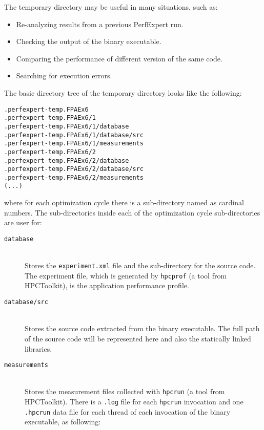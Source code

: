 The temporary directory may be useful in many situations, such as:

\begin{itemize}
	\item Re-analyzing results from a previous PerfExpert run.
	\item Checking the output of the binary executable.
	\item Comparing the performance of different version of the same code.
	\item Searching for execution errors.
\end{itemize}

The basic directory tree of the temporary directory looks like the following:

\begin{lstlisting}[breaklines]
.perfexpert-temp.FPAEx6
.perfexpert-temp.FPAEx6/1
.perfexpert-temp.FPAEx6/1/database
.perfexpert-temp.FPAEx6/1/database/src
.perfexpert-temp.FPAEx6/1/measurements
.perfexpert-temp.FPAEx6/2
.perfexpert-temp.FPAEx6/2/database
.perfexpert-temp.FPAEx6/2/database/src
.perfexpert-temp.FPAEx6/2/measurements
(...)
\end{lstlisting}

\noindent where for each optimization cycle there is a sub-directory named as cardinal numbers. The sub-directories inside each of the optimization cycle sub-directories are user for:

\begin{description}
	\item[\texttt{database}]\hfill \\
	Stores the \texttt{experiment.xml} file and the sub-directory for the source code. The experiment file, which is generated by \texttt{hpcprof} (a tool from HPCToolkit), is the application performance profile.

	\item[\texttt{database/src}]\hfill \\
	Stores the source code extracted from the binary executable. The full path of the source code will be represented here and also the statically linked libraries.

	\item[\texttt{measurements}]\hfill \\
	Stores the measurement files collected with \texttt{hpcrun} (a tool from HPCToolkit). There is a \texttt{.log} file for each \texttt{hpcrun} invocation and one \texttt{.hpcrun} data file for each thread of each invocation of the binary executable, as following:
\end{description}

